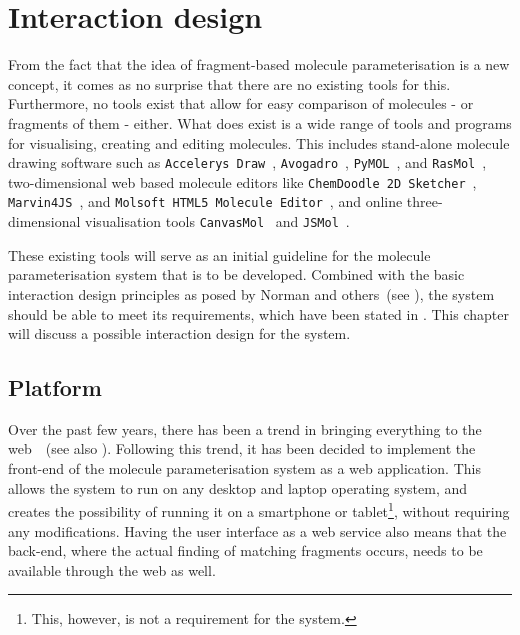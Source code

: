 \chapter{Interaction design}

From the fact that the idea of fragment-based molecule parameterisation is a new concept, it comes as no surprise that there are no existing tools for this. Furthermore, no tools exist that allow for easy comparison of molecules - or fragments of them - either. What does exist is a wide range of tools and programs for visualising, creating and editing molecules. This includes stand-alone molecule drawing software such as \verb|Accelerys Draw|~\cite{accelrys2012accelrys}, \verb|Avogadro|~\cite{hanwell2012avogadro}, \verb|PyMOL|~\cite{delano2002pymol}, and \verb|RasMol|~\cite{pembroke2000bio}, two-dimensional web based molecule editors like \verb|ChemDoodle 2D Sketcher|~\cite{ichemlabs2013chemdoodle}, \verb|Marvin4JS|~\cite{chemxon2013marvin}, and \verb|Molsoft HTML5 Molecule Editor|~\cite{molsoft2012molsoft}, and online three-dimensional visualisation tools \verb|CanvasMol|~\cite{altered2013canvasmol} and \verb|JSMol|~\cite{hanson2013jsmol}.

These existing tools will serve as an initial guideline for the molecule parameterisation system that is to be developed. Combined with the basic interaction design principles as posed by Norman and others~(see ), the system should be able to meet its requirements, which have been stated in . This chapter will discuss a possible interaction design for the system. 


\section{Platform}
Over the past few years, there has been a trend in bringing everything to the web~\cite{ertl2010molecular}~(see also ). Following this trend, it has been decided to implement the front-end of the molecule parameterisation system as a web application. This allows the system to run on any desktop and laptop operating system, and creates the possibility of running it on a smartphone or tablet\footnote{This, however, is not a requirement for the system.}, without requiring any modifications. Having the user interface as a web service also means that the back-end, where the actual finding of matching fragments occurs, needs to be available through the web as well.

